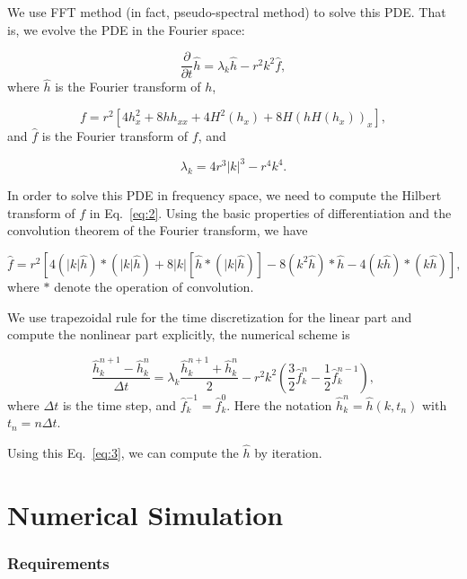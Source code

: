 \documentclass[runningheads]{llncs}
\begin{document}
We use FFT method (in fact, pseudo-spectral method) to solve this PDE. That is, we evolve the PDE in the Fourier space:

\begin{equation}
    \label{eq:fft_pde}
    \frac{\partial}{\partial t}\hat{h}=\lambda_k\hat{h}-r^2k^2\hat{f},
\end{equation}
where $\hat{h}$ is the Fourier transform of $h$,

\begin{equation}
    \label{eq:2}
    f=r^2[4h_x^2+8hh_{xx}+4H^2(h_x)+8H(hH(h_x))_x],
\end{equation}
and $\hat{f}$ is the Fourier transform of $f$, and 

\begin{equation}
    \lambda_k=4r^3|k|^3-r^4k^4.
\end{equation}

In order to solve this PDE in frequency space, we need to compute the Hilbert transform of $f$ in Eq.~\eqref{eq:2}.
Using the basic properties of differentiation and the convolution theorem of the Fourier transform, we have

\begin{equation}
    \label{eq:hatf}
    \hat{f}=r^2\left[4(|k| \hat{h})*(|k| \hat{h})+8|k|\left[\hat{h}*(|k| \hat{h})\right]-8 (k^2 \hat{h})*\hat{h}-4(k \hat{h})*(k \hat{h})\right],
\end{equation}
where $*$ denote the operation of convolution.

We use trapezoidal rule for the time discretization for the linear part and compute the nonlinear part explicitly, the numerical scheme is

\begin{equation}
    \label{eq:3}
    \frac{\hat{h}^{n+1}_k-\hat{h}^{n}_k}{\Delta t}=\lambda_k\frac{\hat{h}^{n+1}_k+\hat{h}^{n}_k}2-r^2k^2\left(\frac32\hat{f}^n_k-\frac12\hat{f}^{n-1}_k\right),
\end{equation}
where $\Delta t$ is the time step, and $\hat{f}^{-1}_k=\hat{f}^{0}_k$. Here the notation $\hat{h}^n_k=\hat{h}(k,t_n)$ with $t_n=n\Delta t$.

Using this Eq.~\eqref{eq:3}, we can compute the $\hat{h}$ by iteration.

\section{Numerical Simulation}

\subsubsection{Requirements}
\end{document}
